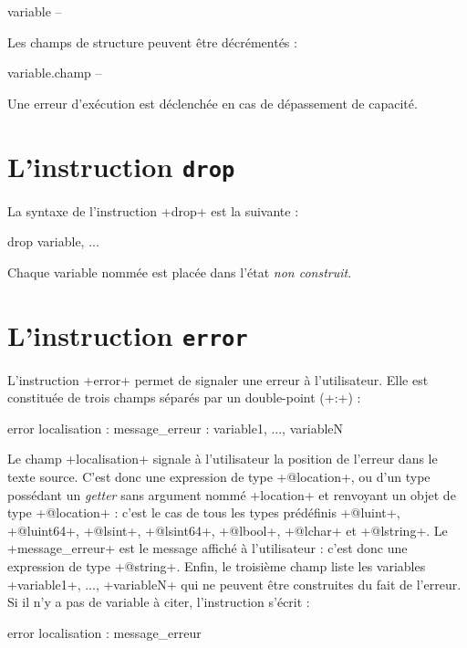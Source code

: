 \begin{galgas}
variable --
\end{galgas}

Les champs de structure peuvent être décrémentés :
\begin{galgas}
variable.champ --
\end{galgas}

Une erreur d'exécution est déclenchée en cas de dépassement de capacité.







\section{L'instruction \texttt{drop}}

La syntaxe de l'instruction \ggs+drop+ est la suivante :

\begin{galgas}
drop variable, ...
\end{galgas}

Chaque variable nommée est placée dans l'état \emph{non construit}.








\section{L'instruction \texttt{error}}

L'instruction \ggs+error+ permet de signaler une erreur à l'utilisateur. Elle est constituée de trois champs séparés par un double-point (\ggs+:+) :

\begin{galgas}
error localisation : message_erreur : variable1, ..., variableN
\end{galgas}



Le champ \ggs+localisation+ signale à l'utilisateur la position de l'erreur dans le texte source. C'est donc une expression de type \ggs+@location+, ou d'un type possédant un \emph{getter} sans argument nommé \ggs+location+ et renvoyant un objet de type \ggs+@location+ : c'est le cas de tous les types prédéfinis \ggs+@luint+, \ggs+@luint64+, \ggs+@lsint+, \ggs+@lsint64+, \ggs+@lbool+, \ggs+@lchar+ et \ggs+@lstring+. Le \ggs+message_erreur+ est le message affiché à l'utilisateur : c'est donc une expression de type \ggs+@string+. Enfin, le troisième champ liste les variables \ggs+variable1+, ..., \ggs+variableN+ qui ne peuvent être construites du fait de l'erreur. Si il n'y a pas de variable à citer, l'instruction s'écrit :
\begin{galgas}
error localisation : message_erreur
\end{galgas}

